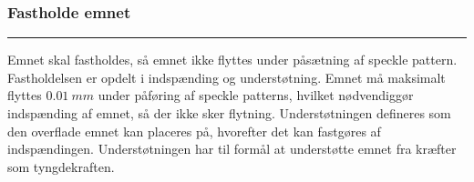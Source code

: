 \subsubsection{Fastholde emnet} \plainbreak{-0.5}
Emnet skal fastholdes, så emnet ikke flyttes under påsætning af speckle pattern. Fastholdelsen er opdelt i indspænding og understøtning. Emnet må maksimalt flyttes \(\SI{0,01}{mm}\) under påføring af speckle patterns, hvilket nødvendiggør indspænding af emnet, så der ikke sker flytning. Understøtningen defineres som den overflade emnet kan placeres på, hvorefter det kan fastgøres af indspændingen. Understøtningen har til formål at understøtte emnet fra kræfter som tyngdekraften.


